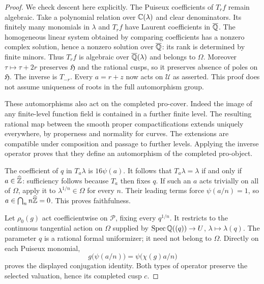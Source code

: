 \begin{proof}
We check descent here explicitly. The Puiseux coefficients of
$T_rf$ remain algebraic. Take a polynomial relation over
$\mathbb C(\lambda)$ and clear denominators. Its finitely many
monomials in $\lambda$ and $T_rf$ have Laurent coefficients in
$\overline{\mathbb Q}$. The homogeneous linear system obtained by
comparing coefficients has a nonzero complex solution, hence
a nonzero solution over $\overline{\mathbb Q}$: its rank is determined
by finite minors. Thus $T_rf$ is algebraic over
$\overline{\mathbb Q}(\lambda)$ and belongs to $\Omega$.
Moreover $\tau\mapsto\tau+2r$ preserves $\mathfrak H$ and
the rational cusps, so it preserves absence of poles on
$\mathfrak H$. The inverse is $T_{-r}$. Every $a=r+z$ now
acts on $\mathcal U$ as asserted. This proof does not assume
uniqueness of roots in the full automorphism group.

These automorphisms also act on the completed pro-cover.
Indeed the image of any finite-level function field is
contained in a further finite level. The resulting rational
map between the smooth proper compactifications extends
uniquely everywhere, by properness and normality for curves.
The extensions are compatible under composition and passage
to further levels. Applying the inverse operator proves that
they define an automorphism of the completed pro-object.

The coefficient of $q$ in $T_a\lambda$ is $16\psi(a)$.
It follows that $T_a\lambda=\lambda$ if and only if
$a\in\widehat{\mathbb Z}$: sufficiency follows because $T_a$ then
fixes $q$. If such an $a$ acts trivially on all of $\Omega$,
apply it to $\lambda^{1/n}\in\Omega$ for every $n$.
Their leading terms force $\psi(a/n)=1$, so
$a\in\bigcap_n n\widehat{\mathbb Z}=0$. This proves faithfulness.

Let $\rho_0(g)$ act coefficientwise on $\mathcal P$, fixing
every $q^{1/n}$. It restricts to the continuous tangential
action on $\Omega$ supplied by
$\operatorname{Spec}\mathbb Q((q))\to U$, $\lambda\mapsto\lambda(q)$.
The parameter $q$ is a rational formal uniformizer; it need
not belong to $\Omega$. Directly on each Puiseux monomial,
\[
 g\bigl(\psi(a/n)\bigr)=\psi\bigl(\chi(g)a/n\bigr)
\]
proves the displayed conjugation identity. Both types of
operator preserve the selected valuation, hence its completed
cusp $c$.
\end{proof}

